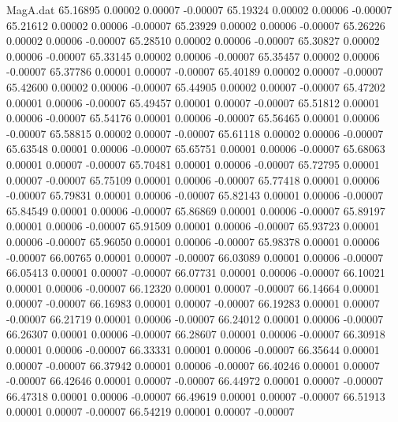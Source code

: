 \begin{filecontents}{MagA.dat}
  65.16895    0.00002    0.00007   -0.00007
  65.19324    0.00002    0.00006   -0.00007
  65.21612    0.00002    0.00006   -0.00007
  65.23929    0.00002    0.00006   -0.00007
  65.26226    0.00002    0.00006   -0.00007
  65.28510    0.00002    0.00006   -0.00007
  65.30827    0.00002    0.00006   -0.00007
  65.33145    0.00002    0.00006   -0.00007
  65.35457    0.00002    0.00006   -0.00007
  65.37786    0.00001    0.00007   -0.00007
  65.40189    0.00002    0.00007   -0.00007
  65.42600    0.00002    0.00006   -0.00007
  65.44905    0.00002    0.00007   -0.00007
  65.47202    0.00001    0.00006   -0.00007
  65.49457    0.00001    0.00007   -0.00007
  65.51812    0.00001    0.00006   -0.00007
  65.54176    0.00001    0.00006   -0.00007
  65.56465    0.00001    0.00006   -0.00007
  65.58815    0.00002    0.00007   -0.00007
  65.61118    0.00002    0.00006   -0.00007
  65.63548    0.00001    0.00006   -0.00007
  65.65751    0.00001    0.00006   -0.00007
  65.68063    0.00001    0.00007   -0.00007
  65.70481    0.00001    0.00006   -0.00007
  65.72795    0.00001    0.00007   -0.00007
  65.75109    0.00001    0.00006   -0.00007
  65.77418    0.00001    0.00006   -0.00007
  65.79831    0.00001    0.00006   -0.00007
  65.82143    0.00001    0.00006   -0.00007
  65.84549    0.00001    0.00006   -0.00007
  65.86869    0.00001    0.00006   -0.00007
  65.89197    0.00001    0.00006   -0.00007
  65.91509    0.00001    0.00006   -0.00007
  65.93723    0.00001    0.00006   -0.00007
  65.96050    0.00001    0.00006   -0.00007
  65.98378    0.00001    0.00006   -0.00007
  66.00765    0.00001    0.00007   -0.00007
  66.03089    0.00001    0.00006   -0.00007
  66.05413    0.00001    0.00007   -0.00007
  66.07731    0.00001    0.00006   -0.00007
  66.10021    0.00001    0.00006   -0.00007
  66.12320    0.00001    0.00007   -0.00007
  66.14664    0.00001    0.00007   -0.00007
  66.16983    0.00001    0.00007   -0.00007
  66.19283    0.00001    0.00007   -0.00007
  66.21719    0.00001    0.00006   -0.00007
  66.24012    0.00001    0.00006   -0.00007
  66.26307    0.00001    0.00006   -0.00007
  66.28607    0.00001    0.00006   -0.00007
  66.30918    0.00001    0.00006   -0.00007
  66.33331    0.00001    0.00006   -0.00007
  66.35644    0.00001    0.00007   -0.00007
  66.37942    0.00001    0.00006   -0.00007
  66.40246    0.00001    0.00007   -0.00007
  66.42646    0.00001    0.00007   -0.00007
  66.44972    0.00001    0.00007   -0.00007
  66.47318    0.00001    0.00006   -0.00007
  66.49619    0.00001    0.00007   -0.00007
  66.51913    0.00001    0.00007   -0.00007
  66.54219    0.00001    0.00007   -0.00007

\end{filecontents}
